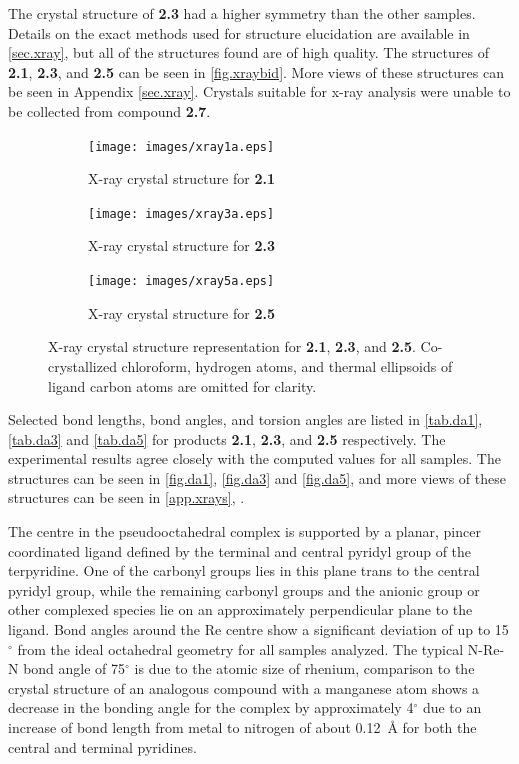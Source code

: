 The crystal structure of \textbf{2.3} had a higher symmetry than the other samples. Details on the exact methods used for structure elucidation are available in \autoref{sec.xray}, but all of the structures found are of high quality. The structures of \textbf{2.1}, \textbf{2.3}, and \textbf{2.5} can be seen in \autoref{fig.xraybid}. More views of these structures can be seen in Appendix \autoref{sec.xray}. Crystals suitable for x-ray analysis were unable to be collected from compound \textbf{2.7}. 

\begin{figure}[!ht]
 \centering
 \begin{subfigure}[b]{0.49\textwidth}
  \texttt{[image: images/xray1a.eps]}
  \caption{X-ray crystal structure for \textbf{2.1}}
  \label{fig.da1}
 \end{subfigure}
 \begin{subfigure}[b]{0.49\textwidth}
  \texttt{[image: images/xray3a.eps]}
  \caption{X-ray crystal structure for \textbf{2.3}}
  \label{fig.da3}
 \end{subfigure}
 \begin{subfigure}[b]{0.49\textwidth}
  \texttt{[image: images/xray5a.eps]}
  \caption{X-ray crystal structure for \textbf{2.5}}
  \label{fig.da5}
 \end{subfigure}
\caption[X-ray crystal structure representation for \textbf{2.1}, \textbf{2.3} and \textbf{2.5}.]{X-ray crystal structure representation for \textbf{2.1}, \textbf{2.3}, and \textbf{2.5}. Co-crystallized chloroform, hydrogen atoms, and thermal ellipsoids of ligand carbon atoms are omitted for clarity.}
\label{fig.xraybid}
\end{figure}

Selected bond lengths, bond angles, and torsion angles are listed in \autoref{tab.da1}, \autoref{tab.da3} and \autoref{tab.da5} for products \textbf{2.1}, \textbf{2.3}, and \textbf{2.5} respectively. The experimental results agree closely with the computed values for all samples. The structures can be seen in \autoref{fig.da1}, \autoref{fig.da3} and \autoref{fig.da5}, and more views of these structures can be seen in \autoref{app.xrays}, . 

The  centre in the pseudooctahedral complex is supported by a planar, pincer coordinated ligand defined by the terminal and central pyridyl group of the terpyridine. One of the carbonyl groups lies in this plane trans to the central pyridyl group, while the remaining carbonyl groups and the anionic group or other complexed species lie on an approximately perpendicular plane to the ligand. Bond angles around the Re centre show a significant deviation of up to 15$^\circ$ from the ideal octahedral geometry for all samples analyzed. The typical N-Re-N bond angle of 75$^\circ$ is due to the atomic size of rhenium, comparison to the crystal structure of an analogous compound with a manganese atom\autocite{compain2014} shows a decrease in the bonding angle for the  complex by approximately 4$^\circ$ due to an increase of bond length from metal to nitrogen of about 0.12~\r{A} for both the central and terminal pyridines. 


